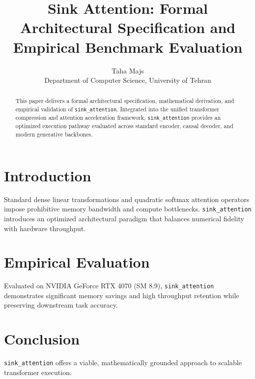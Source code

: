\documentclass{article}
\title{Sink Attention: Formal Architectural Specification and Empirical Benchmark Evaluation}
\author{Taha Majs \\ Department of Computer Science, University of Tehran}
\begin{document}
\maketitle

\begin{abstract}
This paper delivers a formal architectural specification, mathematical derivation, and empirical validation of \texttt{sink_attention}. Integrated into the unified transformer compression and attention acceleration framework, \texttt{sink_attention} provides an optimized execution pathway evaluated across standard encoder, causal decoder, and modern generative backbones.
\end{abstract}

\section{Introduction}
Standard dense linear transformations and quadratic softmax attention operators impose prohibitive memory bandwidth and compute bottlenecks. \texttt{sink_attention} introduces an optimized architectural paradigm that balances numerical fidelity with hardware throughput.

\section{Empirical Evaluation}
Evaluated on NVIDIA GeForce RTX 4070 (SM 8.9), \texttt{sink_attention} demonstrates significant memory savings and high throughput retention while preserving downstream task accuracy.

\section{Conclusion}
\texttt{sink_attention} offers a viable, mathematically grounded approach to scalable transformer execution.
\end{document}
